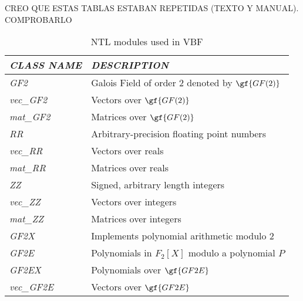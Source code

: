{{{{{{{\long{}%




\frontmatter




CREO QUE ESTAS TABLAS ESTABAN REPETIDAS (TEXTO Y MANUAL). COMPROBARLO






\begin{table}[htbp]%
\caption{NTL modules used in VBF\label{tab:NTLModules}}{
\begin{tabular}{|l|l|}
\hline
\em{CLASS NAME} & \em{DESCRIPTION} \\\hline
\textsl{GF2} & Galois Field of order $2$ denoted by $\gf{GF(2)}$ \\\hline
\textsl{vec\_GF2} & Vectors over $\gf{GF(2)}$ \\\hline
\textsl{mat\_GF2} & Matrices over $\gf{GF(2)}$ \\\hline
\textsl{RR} & Arbitrary-precision floating point numbers \\\hline
\textsl{vec\_RR} & Vectors over reals \\\hline
\textsl{mat\_RR} & Matrices over reals \\\hline
\textsl{ZZ} & Signed, arbitrary length integers \\\hline
\textsl{vec\_ZZ} & Vectors over integers \\\hline
\textsl{mat\_ZZ} & Matrices over integers \\\hline
\textsl{GF2X} & Implements polynomial arithmetic modulo $2$ \\\hline
\textsl{GF2E} & Polynomials in $F_2[X]$ modulo a polynomial $P$ \\\hline
\textsl{GF2EX} & Polynomials over $\gf{GF2E}$ \\\hline
\textsl{vec\_GF2E} & Vectors over $\gf{GF2E}$ \\\hline
\end{tabular}}
\end{table}%



}}}}}}}
